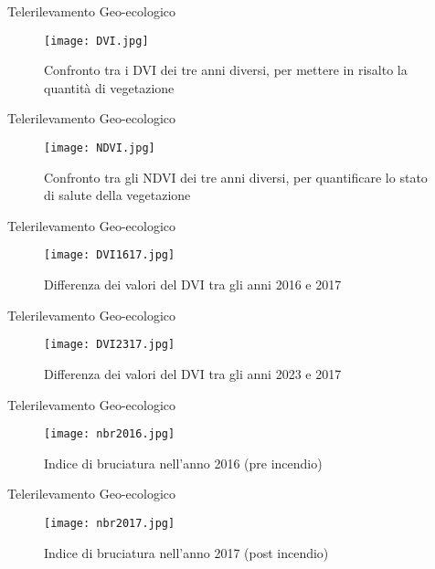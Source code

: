 \documentclass[10pt,aspectratio=169]{beamer}
\begin{document}
\begin{frame}[fragile]{Telerilevamento Geo-ecologico}

\begin{figure}[h]
	\centering
	\texttt{[image: DVI.jpg]}
	\caption{Confronto tra i DVI dei tre anni diversi, per mettere in risalto la quantità di vegetazione}
	\label{fig1}
\end{figure}
\end{frame}

\begin{frame}[fragile]{Telerilevamento Geo-ecologico}

\begin{figure}[h]
	\centering
	\texttt{[image: NDVI.jpg]}
	\caption{Confronto tra gli NDVI dei tre anni diversi, per quantificare lo stato di salute della vegetazione}
	\label{fig1}
\end{figure}
\end{frame} 

\begin{frame}[fragile]{Telerilevamento Geo-ecologico}

\begin{figure}[h]
	\centering
	\texttt{[image: DVI1617.jpg]}
	\caption{Differenza dei valori del DVI tra gli anni 2016 e 2017}
	\label{fig1}
\end{figure}
\end{frame} 

\begin{frame}[fragile]{Telerilevamento Geo-ecologico}

\begin{figure}[h]
	\centering
	\texttt{[image: DVI2317.jpg]}
	\caption{Differenza dei valori del DVI tra gli anni 2023 e 2017}
	\label{fig1}
\end{figure}
\end{frame} 

\begin{frame}[fragile]{Telerilevamento Geo-ecologico}

\begin{figure}[h]
	\centering
	\texttt{[image: nbr2016.jpg]}
	\caption{Indice di bruciatura nell'anno 2016 (pre incendio)}
	\label{fig1}
\end{figure}
\end{frame} 

\begin{frame}[fragile]{Telerilevamento Geo-ecologico}

\begin{figure}[h]
	\centering
	\texttt{[image: nbr2017.jpg]}
	\caption{Indice di bruciatura nell'anno 2017 (post incendio)}
	\label{fig1}
\end{figure}
\end{frame} 
\end{document}

